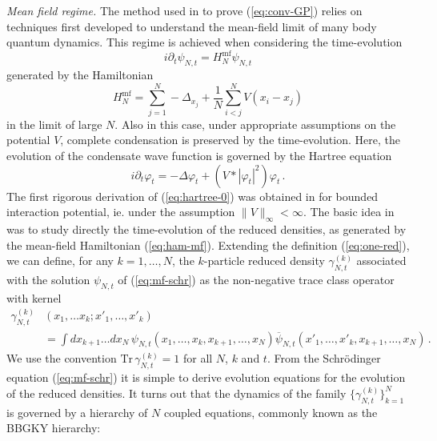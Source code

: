 \documentclass[11pt,a4paper]{article}
\newcommand{\tr}{\mbox{Tr}}
\begin{document}
\bigskip

{\it Mean field regime.} The method used in \cite{ESY1,ESY2,ESY3,ESY4} 
to prove (\ref{eq:conv-GP}) relies on techniques first developed to understand the mean-field limit of many body quantum dynamics. This regime is achieved when considering the time-evolution 
\begin{equation}\label{eq:mf-schr}
i\partial_t \psi_{N,t} = H_N^{\text{mf}} \psi_{N,t} 
\end{equation}
generated by the Hamiltonian
\begin{equation}\label{eq:ham-mf} H_N^{\text{mf}} = \sum_{j=1}^N -\Delta_{x_j} + \frac{1}{N} \sum_{i<j}^N V (x_i -x_j) \end{equation}
in the limit of large $N$. Also in this case, under appropriate assumptions on the potential $V$, 
complete condensation is preserved by the time-evolution. Here, the evolution of the condensate wave function is governed by the Hartree equation
\begin{equation}\label{eq:hartree-0} i\partial_t \varphi_t = -\Delta \varphi_t + \left( V * |\varphi_t|^2\right) \varphi_t \,. \end{equation}
The first rigorous derivation of (\ref{eq:hartree-0}) was obtained in \cite{S} for bounded interaction potential, ie. under the assumption $\| V \|_\infty < \infty$. The basic idea in \cite{S} was to study directly the time-evolution of the reduced densities, as generated by the mean-field Hamiltonian (\ref{eq:ham-mf}). Extending the definition (\ref{eq:one-red}), we can define, for any $k=1,\dots , N$, the $k$-particle reduced density $\gamma^{(k)}_{N,t}$ associated with the solution $\psi_{N,t}$ of (\ref{eq:mf-schr}) as the non-negative trace class operator with kernel 
\begin{equation}\label{eq:kred}
\begin{split}
\gamma^{(k)}_{N,t} &(x_1, \dots x_k ; x'_1, \dots ,x'_k) \\ &= \int dx_{k+1} \dots dx_N \, \psi_{N,t} (x_1,\dots , x_k , x_{k+1}, \dots , x_N) \overline{\psi}_{N,t} (x'_1, \dots , x'_k , x_{k+1} , \dots , x_N) \, . \end{split} \end{equation}
We use the convention $\tr \, \gamma^{(k)}_{N,t} = 1$ for all $N$, $k$ and $t$. {F}rom the Schr\"odinger equation (\ref{eq:mf-schr}) it is simple to derive evolution equations for the evolution of the reduced densities. It turns out that the dynamics of the family $\{ \gamma^{(k)}_{N,t} \}_{k=1}^N$ is governed by a hierarchy of $N$ coupled equations, commonly known as the BBGKY hierarchy:
\end{document}
